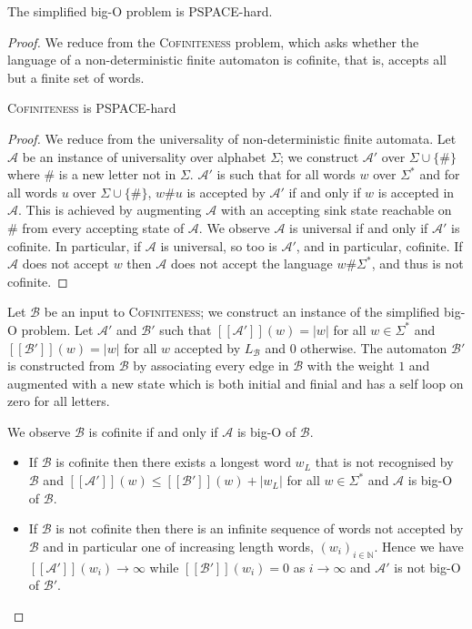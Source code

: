 \documentclass{lmcs}
\theoremstyle{remark}
\newcommand{\autA}{\mathcal{A}}
\newcommand{\autB}{\mathcal{B}}
\newcommand{\brfunc}[1]{[\![#1]\!]}
\theoremstyle{remark}
\begin{document}
\begin{prop}\label{prop:hardness}
The simplified big-O problem is PSPACE-hard.
\end{prop}

\begin{proof}
We reduce from the  \textsc{Cofiniteness} problem, which asks whether the language of a non-deterministic finite automaton is cofinite, that is, accepts all but a finite set of words. 

\begin{lem}\label{prop:cofinitenesshardness}
\textsc{Cofiniteness} is PSPACE-hard 
\end{lem}
\begin{proof}
We reduce from the universality of non-deterministic finite automata. Let $\autA$ be an instance of universality over alphabet $\Sigma$; we construct $\autA'$ over $\Sigma\cup\{\#\}$ where $\#$ is a new letter not in $\Sigma$. $\autA'$ is such that for all words $w$ over $\Sigma^*$ and for all words $u$ over $\Sigma\cup\{\#\}$,   $w\#u$ is accepted by $\autA'$ if and only if $w$ is accepted in $\autA$. This is achieved by augmenting $\autA$ with an accepting sink state reachable on $\#$ from every accepting state of $\autA$. We observe $\autA$ is universal if and only if $\autA'$ is cofinite. In particular, if $\autA$ is universal, so too is $\autA'$, and in particular, cofinite. If $\autA$ does not accept $w$ then $\autA$ does not accept the language $w\#\Sigma^*$, and thus is not cofinite.
\end{proof}

Let $\autB$ be an input to \textsc{Cofiniteness}; we construct an instance of the simplified big-O problem. Let $\autA'$ and $\autB'$ such that $\brfunc{\autA'}(w) = |w|$ for all $w\in\Sigma^*$ and $\brfunc{\autB'}(w) = |w|$ for all $w$ accepted by $L_\autB$ and 0 otherwise. The automaton $\autB'$ is constructed from $\autB$ by associating every edge in $\autB$ with the weight $1$ and augmented with a new state which is both initial and finial and has a self loop on zero for all letters.

We observe $\autB$ is cofinite if and only if $\autA$ is big-O of $\autB$.
\begin{itemize}
    \item If $\autB$ is cofinite then there exists a longest word $w_L$ that is not recognised by $\autB$ and $\brfunc{\autA'}(w) \le \brfunc{\autB'}(w) + |w_L|$ for all $w\in\Sigma^*$ and $\autA$ is big-O of $\autB$. 
    \item If $\autB$ is not cofinite then there is an infinite sequence of words not accepted by $\autB$ and in particular one of increasing length words, $(w_i)_{i\in \mathbb{N}}$. Hence we have $\brfunc{\autA'}(w_i) \to \infty$ while $\brfunc{\autB'}(w_i) = 0$ as $i\to\infty$ and $\autA'$ is not big-O of $\autB'$.\qedhere
\end{itemize}
\end{proof}
\end{document}
